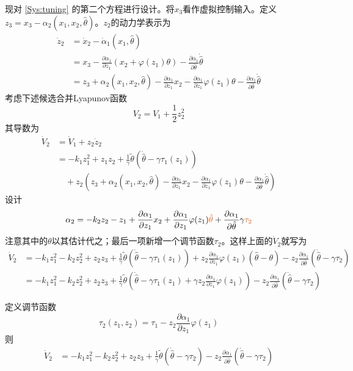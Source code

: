 现对 \eqref{Sys:tuning} 的第二个方程进行设计。将$x_3$看作虚拟控制输入。定义$z_3 = x_3 - \alpha_2 (x_1,x_2, \hat{\theta})$。$z_2$的动力学表示为
\begin{align*}
  \dot{z}_2 & = \dot{x}_2 - \dot{\alpha}_1 (x_1, \hat{\theta})\\
  & = x_3 - \frac{\partial \alpha_1}{\partial z_1} (x_2+\varphi(z_1)\theta)- \frac{\partial
  \alpha_1}{\partial \hat{\theta} } \dot{\hat{\theta}} \\
  & = z_3+\alpha_2(x_1,x_2, \hat{\theta}) - \frac{\partial \alpha_1}{\partial z_1} x_2 - \frac{\partial \alpha_1}{\partial z_1}\varphi(z_1)
  \theta - \frac{\partial
  \alpha_1}{\partial \hat{\theta} } \dot{\hat{\theta}}
\end{align*}
考虑下述候选合并Lyapunov函数
\[ V_2 = V_1 + \frac{1}{2} z^2_2 \]
其导数为
\begin{align*}
    \dot{V}_2&=\dot{V}_1+z_2\dot{z}_2\\
    &=-k_1z_1^2+z_1z_2+\frac{1}{\gamma}\tilde{\theta}(\dot{\hat{\theta}}-\gamma \tau_1(z_1))\\
    &\quad +z_2\left(z_3+\alpha_2(x_1,x_2, \hat{\theta}) - \frac{\partial \alpha_1}{\partial z_1} x_2 - \frac{\partial \alpha_1}{\partial z_1}\varphi(z_1) \theta - \frac{\partial
  \alpha_1}{\partial \hat{\theta} } \dot{\hat{\theta}}\right)
\end{align*}
设计\[\alpha_2=-k_2z_2-z_1+\frac{\partial \alpha_1}{\partial z_1} x_2 +\frac{\partial \alpha_1}{\partial z_1}\varphi(z_1) \textcolor{second}{\hat\theta}+\frac{\partial
  \alpha_1}{\partial \hat{\theta} } \gamma \textcolor{second}{\tau_2}\]
注意其中的$\theta$以其估计代之；最后一项新增一个调节函数$\tau_2$。这样上面的$\dot{V}_2$就写为
\begin{align*}
    \dot{V}_2&=-k_1z_1^2-k_2z_2^2+z_2z_3+\frac{1}{\gamma}\tilde{\theta}(\dot{\hat{\theta}}-\gamma \tau_1(z_1))+z_2\frac{\partial \alpha_1}{\partial z_1}\varphi(z_1) (\hat\theta-\theta)-z_2\frac{\partial
  \alpha_1}{\partial \hat{\theta} }(\dot{\hat{\theta}}-\gamma\tau_2)\\
  &=-k_1z_1^2-k_2z_2^2+z_2z_3+\frac{1}{\gamma}\tilde{\theta}\left(\dot{\hat{\theta}}-\gamma \tau_1(z_1)+\gamma z_2\frac{\partial \alpha_1}{\partial z_1}\varphi(z_1)\right)-z_2\frac{\partial
  \alpha_1}{\partial \hat{\theta} }(\dot{\hat{\theta}}-\gamma\tau_2)
\end{align*}

定义调节函数\[\tau_2(z_1,z_2)=\tau_1-z_2\frac{\partial \alpha_1}{\partial z_1}\varphi(z_1)\]
则
\begin{align*}
    \dot{V}_2&=-k_1z_1^2-k_2z_2^2+z_2z_3+\frac{1}{\gamma}\tilde{\theta}(\dot{\hat{\theta}}-\gamma \tau_2)-z_2\frac{\partial
  \alpha_1}{\partial \hat{\theta} }(\dot{\hat{\theta}}-\gamma\tau_2)
\end{align*}

